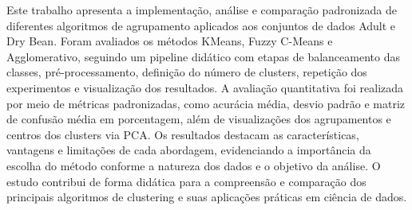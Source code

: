 Este trabalho apresenta a implementação, análise e comparação padronizada de diferentes algoritmos de agrupamento aplicados aos conjuntos de dados Adult e Dry Bean. Foram avaliados os métodos KMeans, Fuzzy C-Means e Agglomerativo, seguindo um pipeline didático com etapas de balanceamento das classes, pré-processamento, definição do número de clusters, repetição dos experimentos e visualização dos resultados. A avaliação quantitativa foi realizada por meio de métricas padronizadas, como acurácia média, desvio padrão e matriz de confusão média em porcentagem, além de visualizações dos agrupamentos e centros dos clusters via PCA. Os resultados destacam as características, vantagens e limitações de cada abordagem, evidenciando a importância da escolha do método conforme a natureza dos dados e o objetivo da análise. O estudo contribui de forma didática para a compreensão e comparação dos principais algoritmos de clustering e suas aplicações práticas em ciência de dados.